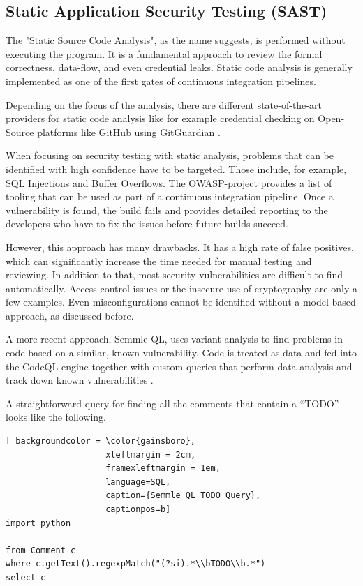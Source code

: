 \subsection{Static Application Security Testing (SAST)}
The "Static Source Code Analysis", as the name suggests, is performed without executing the program. It is a fundamental approach to review the formal correctness, data-flow, and even credential leaks.
Static code analysis is generally implemented as one of the first gates of continuous integration pipelines.

Depending on the focus of the analysis, there are different state-of-the-art providers for static code analysis like for example credential checking on Open-Source platforms like GitHub using GitGuardian \citep{gitGuardian2020}.

When focusing on security testing with static analysis, problems that can be identified with high confidence have to be targeted. Those include, for example, SQL Injections and Buffer Overflows.
The OWASP-project provides a list of tooling that can \citep{owaspStaticTools2020} be used as part of a continuous integration pipeline. 
Once a vulnerability is found, the build fails and provides detailed reporting to the developers who have to fix the issues before future builds succeed.

However, this approach has many drawbacks. It has a high rate of false positives, which can significantly increase the time needed for manual testing and reviewing.
In addition to that, most security vulnerabilities are difficult to find automatically. Access control issues or the insecure use of cryptography are only a few examples. Even misconfigurations cannot be identified without a model-based approach, as discussed before.

A more recent approach, Semmle QL, uses variant analysis to find problems in code based on a similar, known vulnerability. Code is treated as data and fed into the CodeQL engine together with custom queries that perform data analysis and track down known vulnerabilities \citep{semmle2020}. 

A straightforward query for finding all the comments that contain a \enquote{TODO} looks like the following.

\vskip 1cm

\begin{lstlisting}[ backgroundcolor = \color{gainsboro}, 
                    xleftmargin = 2cm, 
                    framexleftmargin = 1em, 
                    language=SQL,
                    caption={Semmle QL TODO Query},
                    captionpos=b]
import python

from Comment c
where c.getText().regexpMatch("(?si).*\\bTODO\\b.*")
select c
\end{lstlisting}


